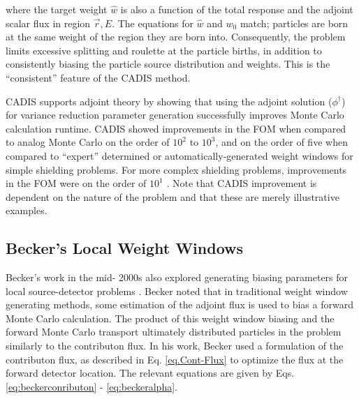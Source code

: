 where the target weight $\hat{w}$ is also a function of the total response and
the adjoint scalar flux in region $\vec{r}, E$.
The equations for $\hat{w}$ and $w_0$ match; particles are born at the same weight
of the region they are born into. Consequently, the problem limits
excessive splitting
and roulette at the particle births, in addition to consistently biasing the
particle source distribution and weights. This is the ``consistent'' feature of
the CADIS method.

CADIS supports adjoint theory by showing that using the adjoint solution
($\phi^{\dagger}$) for variance reduction parameter generation successfully
improves Monte Carlo calculation runtime. CADIS showed improvements in the FOM
when compared to analog Monte Carlo on the order of $10^2$ to $10^3$,
and on the order of five
when compared to ``expert'' determined or automatically-generated weight
windows \cite{wagner_automated_1998, wagner_automated_2002} for simple shielding
problems. For more complex
shielding problems, improvements in the FOM were on the order of $10^1$
\cite{wagner_automatic_1997, wagner_automated_1998}. Note that CADIS improvement
is dependent on the nature of the problem and that these are merely illustrative
examples.

\subsection{Becker's Local Weight Windows}
\label{sec:beckerlocal}

Becker's work in the mid- 2000s also explored generating biasing parameters for
local source-detector problems \cite{becker_hybrid_2009}. Becker noted that in
traditional weight window generating methods, some estimation of the adjoint
flux is used to bias a forward Monte Carlo calculation. The product of this
weight window biasing and the forward Monte Carlo transport ultimately
distributed particles in the problem similarly to the contributon flux.
In his work, Becker
used a formulation of the contributon flux, as described in Eq.
\eqref{eq.Cont-Flux} to optimize the flux at the forward detector location.
The
relevant equations are given by Eqs. \eqref{eq:beckerconributon} -
\eqref{eq:beckeralpha}.

